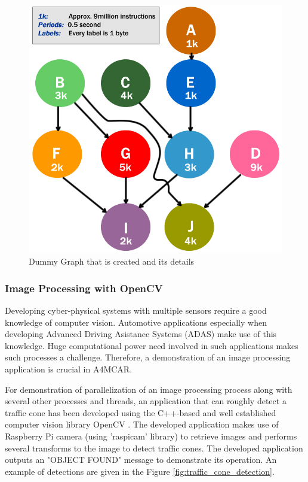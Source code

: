 \begin{figure}[!ht]
	\centering
	\includegraphics[scale=0.4]{content/images/dummygraph.png}
	\caption{Dummy Graph that is created and its details}
	\label{fig:dummygraph}
\end{figure}


\subsubsection{Image Processing with OpenCV}
Developing cyber-physical systems with multiple sensors require a good knowledge of computer vision. Automotive applications especially when developing Advanced Driving Asistance Systems (ADAS) make use of this knowledge. Huge computational power need involved in such applications makes such processes a challenge. Therefore, a demonstration of an image processing application is crucial in A4MCAR.

For demonstration of parallelization of an image processing process along with several other processes and threads, an application that can roughly detect a traffic cone has been developed using the C++-based and well established computer vision library OpenCV \cite{opencv}. The developed application makes use of Raspberry Pi camera (using 'raspicam' library) to retrieve images and performs several transforms to the image to detect traffic cones. The developed application outputs an "OBJECT FOUND" message to demonstrate its operation. An example of detections are given in the Figure \ref{fig:traffic_cone_detection}.

